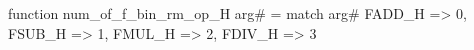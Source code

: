 function num_of_f_bin_rm_op_H arg# = match arg# {
  FADD_H => 0,
  FSUB_H => 1,
  FMUL_H => 2,
  FDIV_H => 3
}

